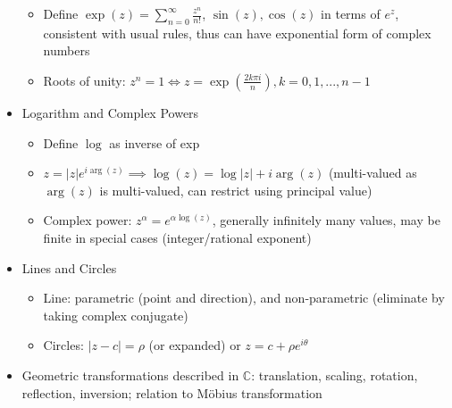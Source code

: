 \begin{itemize}
\begin{itemize}
                  \item Define $\exp(z)=\sum_{n=0}^{\infty}\frac{z^{n}}{n!}$, $\sin(z),\cos(z)$
                        in terms of $e^{z}$, consistent with usual rules, thus can have exponential
                        form of complex numbers
                  \item Roots of unity: $z^{n}=1\iff z=\exp(\frac{2k\pi i}{n}),k=0,1,...,n-1$
            \end{itemize}
      \item Logarithm and Complex Powers
            \begin{itemize}
                  \item Define $\log$ as inverse of exp
                  \item $z=|z|e^{i\arg(z)}\implies\log(z)=\log|z|+i\arg(z)$ (multi-valued
                        as $\arg(z)$ is multi-valued, can restrict using principal value)
                  \item Complex power: $z^{\alpha}=e^{\alpha\log(z)}$, generally infinitely
                        many values, may be finite in special cases (integer/rational exponent)
            \end{itemize}
      \item Lines and Circles
            \begin{itemize}
                  \item Line: parametric (point and direction), and non-parametric (eliminate
                        by taking complex conjugate)
                  \item Circles: $|z-c|=\rho$ (or expanded) or $z=c+\rho e^{i\theta}$
            \end{itemize}
      \item Geometric transformations described in $\mathbb{C}$: translation,
            scaling, rotation, reflection, inversion; relation to Möbius transformation
\end{itemize}

